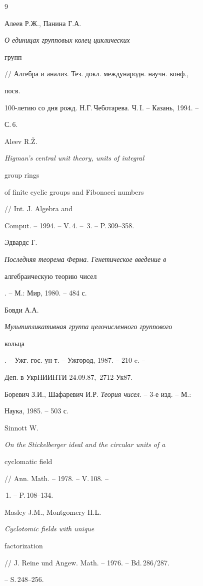 \begin{thebibliography}{9} 


 




Алеев Р.Ж., Панина Г.А. {\em О единицах групповых колец циклических 


групп} // Алгебра и анализ. Тез. докл. международн. научн. конф., 


посв.  


100-летию со дня рожд. Н.Г.\,Чеботарева. Ч.\,I. -- Казань, 1994. -- 


С.\,6. 




Aleev R.\v Z. {\em Higman's central unit theory, units of integral 


group rings 


of finite cyclic groups and Fibonacci numbers} // Int. J. Algebra and 


Comput. -- 1994. -- V.\,4. -- \No\,3. -- P.\,309--358. 




Эдвардс Г. {\em Последняя теорема Ферма. Генетическое введение в 


алгебраическую теорию чисел}. -- М.: Мир, 1980. -- 484 с. 




Бовди А.А. {\em Мультипликативная группа целочисленного группового 


кольца}. -- Ужг. гос. ун-т. -- Ужгород, 1987. -- 210 c. -- 


Деп. в УкрНИИНТИ 24.09.87, \No\,2712-Ук87. 




Боревич З.И., Шафаревич И.Р. {\em Теория чисел}. -- 3-е изд. -- М.: 


Наука, 1985. -- 503 с. 




Sinnott W. {\em On the Stickelberger ideal and the circular units of a 


cyclomatic field} // Ann. Math. -- 1978. -- V.\,108. -- 


\No\,1. -- P.\,108--134. 




Masley J.M., Montgomery H.L. {\em Cyclotomic fields with unique 


factorization} // J. Reine und Angew. Math. -- 1976. -- Bd.\,286/287. 


-- S.\,248--256. 


 


\end{thebibliography} 



